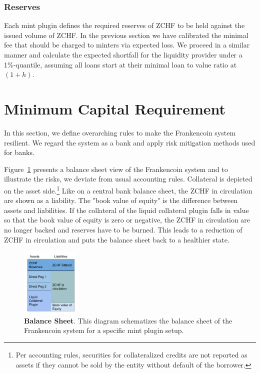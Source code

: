 \documentclass[english,11pt]{article}
\begin{document}
\subsubsection{Reserves}
Each mint plugin defines the required reserves of ZCHF to be held against
the issued volume of ZCHF. In the previous section we have calibrated
the minimal fee that should be charged to minters via expected loss.
We proceed in a similar manner and calculate the expected shortfall
for the liquidity provider under a 1\%-quantile, assuming all
loans start at their minimal loan to value ratio at $(1+h)$.


\section{Minimum Capital Requirement}
In this section, we define overarching rules to make the Frankencoin system
resilient. We regard the system as a bank and apply risk mitigation methods
used for banks.

Figure~\ref{fig:bs} presents a balance sheet view of the Frankencoin system
and to illustrate the risks, we deviate from usual accounting rules.
Collateral is depicted on the asset side.\footnote{Per accounting rules, 
securities for collateralized credits are not reported as assets
if they cannot be sold by the entity without default of the borrower.}
Like on a central bank balance sheet, the ZCHF in circulation are shown
as a liability. The "book value of equity" is the difference between assets
and liabilities. If the collateral of the liquid collateral plugin falls in value so that
the book value of equity is zero or negative, the ZCHF in circulation
are no longer backed and reserves have to be burned. This leads
to a reduction of ZCHF in circulation and puts the balance sheet back to
a healthier state.

\begin{figure}[h]
    \center
    \includegraphics[width=0.25\textwidth]{FCBalanceSheet.pdf}
    \caption{\textbf{Balance Sheet}. This diagram
    schematizes the balance sheet of the Frankencoin system for
    a specific mint plugin setup.}\label{fig:bs}
\end{figure}
\end{document}
